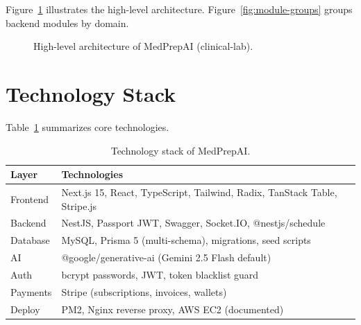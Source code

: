 Figure~\ref{fig:architecture} illustrates the high-level architecture. Figure~\ref{fig:module-groups} groups backend modules by domain.



\begin{figure}[htbp]
  \centering
  \caption{High-level architecture of MedPrepAI (clinical-lab).}
  \label{fig:architecture}
\end{figure}

\section{Technology Stack}
Table~\ref{tab:stack} summarizes core technologies.

\begin{table}[htbp]
  \centering
  \caption{Technology stack of MedPrepAI.}
  \label{tab:stack}
  \begin{tabular}{@{}ll@{}}
    \toprule
    \textbf{Layer} & \textbf{Technologies} \\
    \midrule
    Frontend & Next.js 15, React, TypeScript, Tailwind, Radix, TanStack Table, Stripe.js \\
    Backend & NestJS, Passport JWT, Swagger, Socket.IO, @nestjs/schedule \\
    Database & MySQL, Prisma 5 (multi-schema), migrations, seed scripts \\
    AI & @google/generative-ai (Gemini 2.5 Flash default) \\
    Auth & bcrypt passwords, JWT, token blacklist guard \\
    Payments & Stripe (subscriptions, invoices, wallets) \\
    Deploy & PM2, Nginx reverse proxy, AWS EC2 (documented) \\
    \bottomrule
  \end{tabular}
\end{table}

